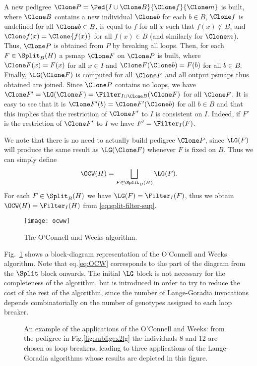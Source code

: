 A new pedigree $\Clone P = \Ped {I\cup \Clone B} {\Clone f} {\Clone m}$ is built, where
$\Clone B$ contains a new individual $\Clone b$ for each $b\in B$,
$\Clone f$ is undefined for all $\Clone b\in B$, is equal to $f$ for all $x$ such that
$f(x) \not\in B$, and $\Clone f(x) = \Clone {f(x)}$
for all $f(x)\in B$ (and similarly for $\Clone m$).
Thus, $\Clone P$ is obtained from $P$ by breaking all loops.
Then, for each $F\in\Split_B(H)$ a psmap $\Clone F$ on $\Clone P$ is built, where
$\Clone F(x) = F(x)$ for all $x\in I$ and $\Clone F(\Clone b) = F(b)$ for all $b\in B$.
Finally, $\LG(\Clone F)$ is computed for all $\Clone F$
and all output psmaps thus obtained are joined.
Since $\Clone P$ contains no loops,
we have $\Clone F'=\LG(\Clone F) = \Filter_{I\cup \Clone B}(\Clone F)$ for all $\Clone F$.
It is easy to see that it is $\Clone F'(b) = \Clone F'(\Clone b)$ for all $b\in B$ and
that this implies that the restriction of $\Clone F'$ to $I$ is consistent on $I$.
Indeed, if $F'$ is the restriction of $\Clone F'$ to $I$ we have $F'=\Filter_I(F)$.

We note that there is no need to actually build pedigree $\Clone P$,
since $\LG(F)$ will produce the same result as $\LG(\Clone F)$ whenever
$F$ is fixed on $B$. Thus we can simply define
\begin{equation}
  \label{eq:OCW}
  \OCW(H) = \bigsqcup_{F\in\Split_B(H)}\LG(F).
\end{equation}
For each $F\in\Split_B(H)$ we have $\LG(F) = \Filter_I(F)$, thus
we obtain $\OCW(H) = \Filter_I(H)$ from \eqref{eq:split-filter-sup}.

\begin{figure}
  \centering
  \texttt{[image: ocww]}
  \caption{The O'Connell and Weeks algorithm.}
  \label{fig:OCW}
\end{figure}
Fig.~\ref{fig:OCW} shows a block-diagram representation of the O'Connell and Weeks algorithm.
Note that eq.\eqref{eq:OCW} corresponds to the part of the diagram from the $\Split$ block
onwards. The initial $\LG$ block is not necessary for the completeness of the algorithm,
but is introduced in order to try to reduce the cost of the rest of the algorithm,
since the number of Lange-Goradia invocations depends combinatorially on the number
of genotypes assigned to each loop breaker.

\begin{figure}
  \centering
  \caption{An example of the applications of the O'Connell and Weeks: from the
    pedigree in Fig.\ref{fig:subfigex2lg} the individuals 8 and 12 are chosen as
    loop breakers, leading to three applications of the Lange-Goradia algorithms
    whose results are depicted in this figure.}
  \label{fig:example2-decomposed}
\end{figure}


